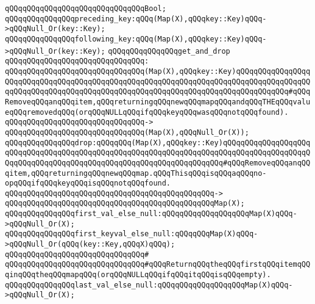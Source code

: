 \verb|qQQqqQQqqQQqqQQqqQQqqQQqqQQqqQQqBool;|\newline
\newline
\verb|qQQqqQQqqQQqqQQqpreceding_key:qQQq(Map(X),qQQqkey::Key)qQQq->qQQqNull_Or(key::Key);|\newline
\verb|qQQqqQQqqQQqqQQqfollowing_key:qQQq(Map(X),qQQqkey::Key)qQQq->qQQqNull_Or(key::Key);|\newline
\newline
\verb|qQQqqQQqqQQqqQQqget_and_drop|\newline
\verb|qQQqqQQqqQQqqQQqqQQqqQQqqQQqqQQq:|\newline
\verb|qQQqqQQqqQQqqQQqqQQqqQQqqQQqqQQq(Map(X),qQQqkey::Key)qQQqqQQqqQQqqQQqqQQqqQQqqQQqqQQqqQQqqQQqqQQqqQQqqQQqqQQqqQQqqQQqqQQqqQQqqQQqqQQqqQQqqQQqqQQqqQQqqQQqqQQqqQQqqQQqqQQqqQQqqQQqqQQqqQQqqQQqqQQqqQQqqQQqqQQq#qQQqRemoveqQQqanqQQqitem,qQQqreturningqQQqnewqQQqmapqQQqandqQQqTHEqQQqvalueqQQqremovedqQQq(orqQQqNULLqQQqifqQQqkeyqQQqwasqQQqnotqQQqfound).|\newline
\verb|qQQqqQQqqQQqqQQqqQQqqQQqqQQqqQQq->|\newline
\verb|qQQqqQQqqQQqqQQqqQQqqQQqqQQqqQQq(Map(X),qQQqNull_Or(X));|\newline
\newline
\verb|qQQqqQQqqQQqqQQqdrop:qQQqqQQq(Map(X),qQQqkey::Key)qQQqqQQqqQQqqQQqqQQqqQQqqQQqqQQqqQQqqQQqqQQqqQQqqQQqqQQqqQQqqQQqqQQqqQQqqQQqqQQqqQQqqQQqqQQqqQQqqQQqqQQqqQQqqQQqqQQqqQQqqQQqqQQqqQQqqQQqqQQq#qQQqRemoveqQQqanqQQqitem,qQQqreturningqQQqnewqQQqmap.qQQqThisqQQqisqQQqaqQQqno-opqQQqifqQQqkeyqQQqisqQQqnotqQQqfound.|\newline
\verb|qQQqqQQqqQQqqQQqqQQqqQQqqQQqqQQqqQQqqQQqqQQqqQQq->|\newline
\verb|qQQqqQQqqQQqqQQqqQQqqQQqqQQqqQQqqQQqqQQqqQQqqQQqMap(X);|\newline
\newline
\verb|qQQqqQQqqQQqqQQqfirst_val_else_null:qQQqqQQqqQQqqQQqqQQqMap(X)qQQq->qQQqNull_Or(X);|\newline
\verb|qQQqqQQqqQQqqQQqfirst_keyval_else_null:qQQqqQQqMap(X)qQQq->qQQqNull_Or(qQQq(key::Key,qQQqX)qQQq);|\newline
\verb|qQQqqQQqqQQqqQQqqQQqqQQqqQQqqQQq#|\newline
\verb|qQQqqQQqqQQqqQQqqQQqqQQqqQQqqQQq#qQQqReturnqQQqtheqQQqfirstqQQqitemqQQqinqQQqtheqQQqmapqQQq(orqQQqNULLqQQqifqQQqitqQQqisqQQqempty).|\newline
\newline
\verb|qQQqqQQqqQQqqQQqlast_val_else_null:qQQqqQQqqQQqqQQqqQQqMap(X)qQQq->qQQqNull_Or(X);|\newline
